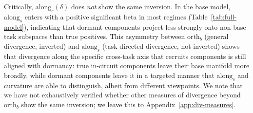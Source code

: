 Critically, $\mathrm{along}_s(\delta)$ does \emph{not} show the same inversion. In the base model, $\mathrm{along}_s$ enters with a positive significant beta in most regimes (Table~\ref{tab:full-model}), indicating that dormant components project less strongly onto non-base task subspaces than true positives. This asymmetry between $\mathrm{orth}_b$ (general divergence, inverted) and $\mathrm{along}_s$ (task-directed divergence, not inverted) shows that divergence along the specific cross-task axis that recruits components is still aligned with dormancy: true in-circuit components leave their base manifold more broadly, while dormant components leave it in a targeted manner that $\mathrm{along}_s$ and curvature are able to distinguish, albeit from different viewpoints. We note that we have not exhaustively verified whether other measures of divergence beyond $\mathrm{orth}_b$ show the same inversion; we leave this to Appendix~\ref{app:div-measures}.


